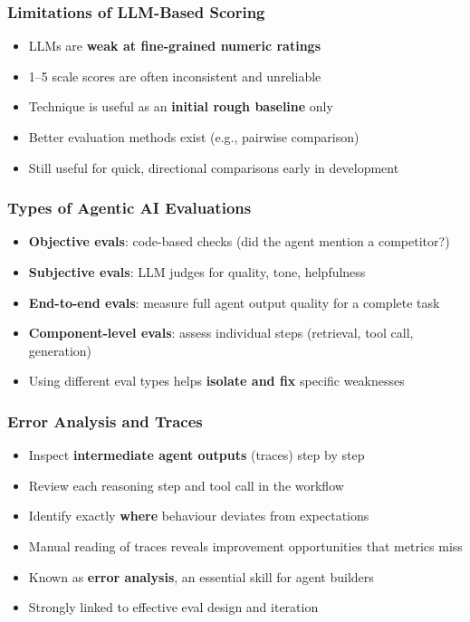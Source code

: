 \begin{frame}[fragile]\frametitle{Limitations of LLM-Based Scoring}
      \begin{itemize}
        \item LLMs are \textbf{weak at fine-grained numeric ratings}
        \item 1--5 scale scores are often inconsistent and unreliable
        \item Technique is useful as an \textbf{initial rough baseline} only
        \item Better evaluation methods exist (e.g., pairwise comparison)
        \item Still useful for quick, directional comparisons early in development
      \end{itemize}
\end{frame}

\begin{frame}[fragile]\frametitle{Types of Agentic AI Evaluations}
      \begin{itemize}
        \item \textbf{Objective evals}: code-based checks (did the agent mention a competitor?)
        \item \textbf{Subjective evals}: LLM judges for quality, tone, helpfulness
        \item \textbf{End-to-end evals}: measure full agent output quality for a complete task
        \item \textbf{Component-level evals}: assess individual steps (retrieval, tool call, generation)
        \item Using different eval types helps \textbf{isolate and fix} specific weaknesses
      \end{itemize}
\end{frame}

\begin{frame}[fragile]\frametitle{Error Analysis and Traces}
      \begin{itemize}
        \item Inspect \textbf{intermediate agent outputs} (traces) step by step
        \item Review each reasoning step and tool call in the workflow
        \item Identify exactly \textbf{where} behaviour deviates from expectations
        \item Manual reading of traces reveals improvement opportunities that metrics miss
        \item Known as \textbf{error analysis}, an essential skill for agent builders
        \item Strongly linked to effective eval design and iteration
      \end{itemize}
\end{frame}


